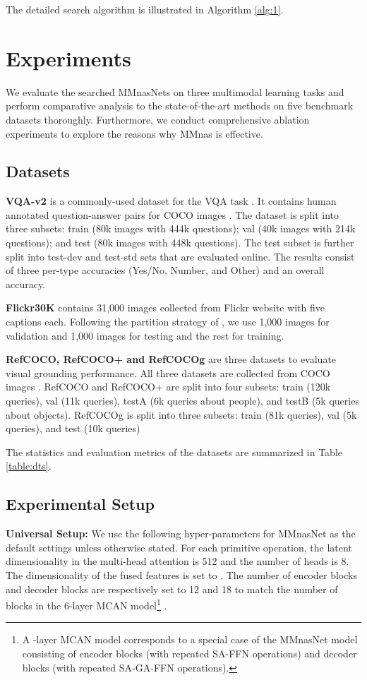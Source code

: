 \documentclass[sigconf]{acmart}
\begin{document}
The detailed search algorithm is illustrated in Algorithm \ref{alg:1}.

\section{Experiments}
We evaluate the searched MMnasNets on three multimodal learning tasks and perform comparative analysis to the state-of-the-art methods on five benchmark datasets thoroughly. Furthermore, we conduct comprehensive ablation experiments to explore the reasons why MMnas is effective.

\subsection{Datasets}
\noindent\textbf{VQA-v2} is a commonly-used dataset for the VQA task \cite{goyal2016making}. It contains human annotated question-answer pairs for COCO images \cite{lin2014microsoft}. The dataset is split into three subsets: {train} (80k images with 444k questions); {val} (40k images with 214k questions); and {test} (80k images with 448k questions). The {test} subset is further split into {test-dev} and {test-std} sets that are evaluated online. The results consist of three per-type accuracies (Yes/No, Number, and Other) and an overall accuracy.

\noindent\textbf{Flickr30K} contains 31,000 images collected from Flickr website with five captions each. Following the partition strategy of \cite{lee2018stacked,karpathy2015deep}, we use 1,000 images for validation and 1,000 images for testing and the rest for training.

\noindent\textbf{RefCOCO, RefCOCO+ and RefCOCOg} are three datasets to evaluate visual grounding performance. All three datasets are collected from COCO images \cite{lin2014microsoft}. RefCOCO and RefCOCO+ are split into four subsets: train (120k queries), val (11k queries), testA (6k queries about people), and testB (5k queries about objects). RefCOCOg is split into three subsets: train (81k queries), val (5k queries), and test (10k queries)

The statistics and evaluation metrics of the datasets are summarized in Table \ref{table:dts}.

\subsection{Experimental Setup}
\noindent\textbf{Universal Setup:} We use the following hyper-parameters for MMnasNet as the default settings unless otherwise stated. For each primitive operation, the latent dimensionality in the multi-head attention  is 512 and the number of heads  is 8. The dimensionality of the fused features  is set to . The number of encoder blocks  and decoder blocks  are respectively set to 12 and 18 to match the number of blocks in the 6-layer MCAN model\footnote{A -layer MCAN model corresponds to a special case of the MMnasNet model consisting of  encoder blocks (with repeated \textsf{SA}-\textsf{FFN} operations) and  decoder blocks (with repeated \textsf{SA}-\textsf{GA}-\textsf{FFN} operations).} \cite{yu2019mcan}.
\end{document}
